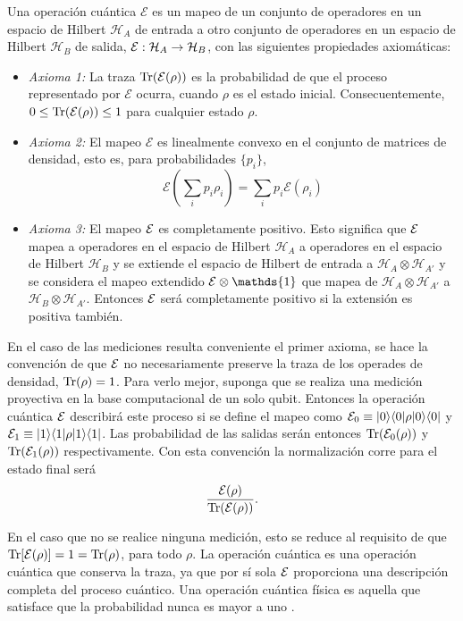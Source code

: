 \begin{definition}\label{DefE(rho)} Una operación cuántica $\mathcal{E}$ es un mapeo de un conjunto de operadores en un espacio de Hilbert $\mathcal{H}_A$ de entrada a otro conjunto de operadores en un espacio de Hilbert $\mathcal{H}_B$ de salida, $\mathcal{E}: \mathcal{H}_A \rightarrow \mathcal{H}_B$, con las siguientes propiedades axiomáticas:

    \begin{itemize}
        \item \textit{Axioma 1:} La traza ${\rm Tr} (\mathcal{E}(\rho))$ es la probabilidad de que el proceso representado por $\mathcal{E}$ ocurra, cuando $\rho$ es el estado inicial. Consecuentemente, $0 \le {\rm Tr} (\mathcal{E}(\rho)) \le 1$ para cualquier estado $\rho$.
        \item \textit{Axioma 2:} El mapeo $\mathcal{E}$ es linealmente convexo en el conjunto de matrices de densidad, esto es, para probabilidades $\{p_i\}$,\[\mathcal{E}\left(\sum _i p_i \rho _i\right)=\sum_i p_i \mathcal{E}(\rho_i)\]
        \item\textit{Axioma 3:} El mapeo $\mathcal{E}$ es completamente positivo. Esto significa que $\mathcal{E}$ mapea a operadores en el espacio de Hilbert $\mathcal{H}_{A}$  a operadores en el espacio de Hilbert $\mathcal{H}_B$ y se extiende el espacio de Hilbert de entrada a $\mathcal{H}_A\otimes\mathcal{H}_{A'}$ y se considera el mapeo extendido $\E \otimes \mathds{1}$ que mapea de $\mathcal{H}_A \otimes \mathcal{H}_{A'} $ a $\mathcal{H}_B \otimes \mathcal{H}_{A'}$. Entonces  $\mathcal{E}$ será completamente positivo si la extensión es positiva también.
    \end{itemize}
\end{definition}

En el caso de las mediciones resulta conveniente el primer axioma, se hace la convención de que $\mathcal{E}$ no necesariamente preserve la traza de los operades de densidad, ${\rm Tr}(\rho)=1$. Para verlo mejor, suponga que se realiza una medición proyectiva en la base computacional de un solo qubit. Entonces la operación cuántica $\mathcal{E}$ describirá este proceso si se define el mapeo como $\mathcal{E}_0\equiv|0\rangle \langle0|\rho |0\rangle \langle 0|$ y $\mathcal{E}_1\equiv|1\rangle \langle1|\rho |1\rangle \langle 1|$. Las probabilidad de las salidas serán entonces ${\rm Tr} (\mathcal{E}_0(\rho))$ y ${\rm Tr} (\mathcal{E}_1(\rho))$ respectivamente.  Con esta convención la normalización corre para el estado final será \[\dfrac{\mathcal{E}(\rho)}{{\rm Tr} (\mathcal{E} (\rho))}.\]

En el caso que no se realice ninguna medición, esto se reduce al requisito de que ${\rm Tr}[\mathcal{E}(\rho)] = 1 = {\rm Tr}(\rho)$, para todo $\rho$. La operación cuántica es una operación cuántica que conserva la traza, ya que por sí sola $\mathcal{E}$ proporciona una descripción completa del proceso cuántico. Una operación cuántica física es aquella que satisface que la probabilidad nunca es mayor a uno {\cite{nielsen_chuang_2010}}.


